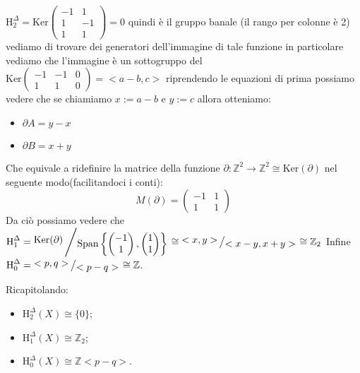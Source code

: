 \documentclass[11pt, a4paper, twoside]{article}
\newcommand{\bigslant}[2]{{\raisebox{.2em}{$#1$}\left/\raisebox{-.2em}{$#2$}\right.}}
\begin{document}
\begin{sol}
\begin{center}
\begin{tikzcd}[ampersand replacement=\&]
		\end{tikzcd}
	\end{center}
	$\text{H}_2^{\Delta}=\text{Ker}\begin{pmatrix}-1 &1\\1 &-1\\1 &1\end{pmatrix}=0$ quindi è il gruppo banale (il rango per colonne è 2) vediamo di trovare dei generatori dell'immagine di tale funzione in particolare vediamo che l'immagine è un sottogruppo del $\text{Ker}\begin{pmatrix}-1 &-1& 0\\1 &1&0\end{pmatrix}=<a-b,c>$ riprendendo le equazioni di prima possiamo vedere che se chiamiamo $x:=a-b$ e $y:=c$ allora otteniamo: 
	\begin{itemize}
		\item $\partial A=y-x$ 
		\item $\partial B=x+y$ 
	\end{itemize} 
	Che equivale a ridefinire la matrice della funzione $\partial:\mathbb{Z}^2\rightarrow\mathbb{Z}^2\cong\text{Ker}(\partial)$ nel seguente modo(facilitandoci i conti):
	\[
		M(\partial)=\begin{pmatrix}-1&1\\1&1\end{pmatrix}
	\]
	Da ciò possiamo vedere che $\text{H}_1^{\Delta}=\bigslant{\text{Ker}(\partial)}{\text{Span}\left\{\begin{pmatrix}-1\\1\end{pmatrix},\begin{pmatrix}1\\1\end{pmatrix}\right\}}\cong\bigslant{<x,y>}{<x-y,x+y>}\cong \mathbb{Z}_2$
	Infine $\text{H}_0^{\Delta}=\bigslant{<p,q>}{<p-q>}\cong\mathbb{Z}$.
	
	Ricapitolando:
	\begin{itemize}
		\item $\text{H}_{2}^{\Delta}(X)\cong\{0\}$;
		\item $\text{H}_{1}^{\Delta}(X)\cong\mathbb{Z}_2$;
		\item $\text{H}_{0}^{\Delta}(X)\cong\mathbb{Z}<p-q>$.
	\end{itemize}
\end{sol}
\end{document}
